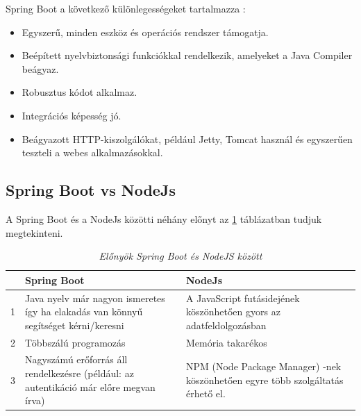Spring Boot a következő különlegességeket tartalmazza \cite{nodejsspring}:
\begin{itemize}
	\item Egyszerű, minden eszköz és operációs rendszer támogatja.
	\item Beépített nyelvbiztonsági funkciókkal rendelkezik, amelyeket a Java Compiler beágyaz.
	\item Robusztus kódot alkalmaz.
	\item Integrációs képesség jó.
	\item Beágyazott HTTP-kiszolgálókat, például Jetty, Tomcat használ és egyszerűen teszteli a webes alkalmazásokkal.
\end{itemize}

\subsection{Spring Boot vs NodeJs}

A Spring Boot és a NodeJs közötti néhány előnyt \cite{nodespringcomp} az \ref{tab:tableSpringNodeJsPros} táblázatban tudjuk megtekinteni.
\begin{table}[H]
	\begin{footnotesize}
		\begin{center}
			\caption[Előnyök Spring Boot és NodeJS között]{\textit{Előnyök Spring Boot és NodeJS között}}
			\label{tab:tableSpringNodeJsPros}
			\begin{tabular}{p{0.5cm}|p{6cm}|p{6cm}}
				\textbf & \textbf{Spring Boot} & \textbf{NodeJs}\\
				\hline
				1 & Java nyelv már nagyon ismeretes így ha elakadás van könnyű segítséget kérni/keresni& A JavaScript futásidejének köszönhetően gyors az adatfeldolgozásban\\
				\hline
				2 & Többszálú programozás & Memória takarékos\\
				\hline
				3 & Nagyszámú erőforrás áll rendelkezésre (például: az autentikáció már előre megvan írva) & NPM (Node Package Manager) -nek köszönhetően egyre több szolgáltatás érhető el. \\
			\end{tabular}
		\end{center}
	\end{footnotesize}
\end{table}

